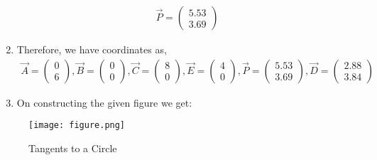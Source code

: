 \documentclass[journal,12pt,twocolumn]{IEEEtran}
\newcommand{\myvec}[1]{\ensuremath{\begin{pmatrix}#1\end{pmatrix}}}
\begin{document}
\begin{enumerate}
\begin{align}
    \vec{P}=\myvec{5.53\\3.69}
\end{align}
\item Therefore, we have coordinates as,
\begin{align}
    \vec{A}=\myvec{0\\6}, \vec{B}=\myvec{0\\0}, \vec{C}=\myvec{8\\0}, \vec{E}=\myvec{4\\0}, \vec{P}=\myvec{5.53\\3.69}, \vec{D}=\myvec{2.88\\3.84}
\end{align}
\item On constructing the given figure we get:
\end{enumerate}
\begin{figure}[!ht]
\texttt{[image: figure.png]}
\caption{Tangents to a Circle}
\label{fig:Circle}	
\end{figure}
\end{document}
